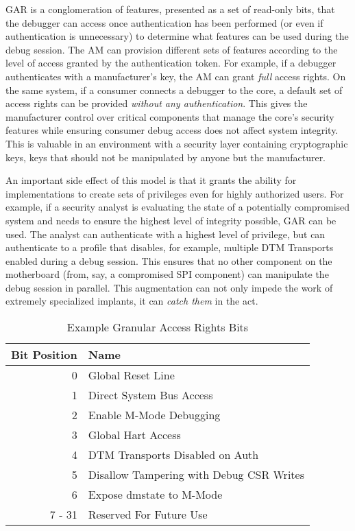 GAR is a conglomeration of features, presented as a set of read-only bits, that the debugger can access once authentication has been performed (or even if authentication is unnecessary) to determine what features can be used during the debug session. The AM can provision different sets of features according to the level of access granted by the authentication token. For example, if a debugger authenticates with a manufacturer's key, the AM can grant {\em full} access rights. On the same system, if a consumer connects a debugger to the core, a default set of access rights can be provided {\em without any authentication}. This gives the manufacturer control over critical components that manage the core's security features while ensuring consumer debug access does not affect system integrity. This is valuable in an environment with a security layer containing cryptographic keys, keys that should not be manipulated by anyone but the manufacturer. 

An important side effect of this model is that it grants the ability for implementations to create sets of privileges even for highly authorized users. For example, if a security analyst is evaluating the state of a potentially compromised system and needs to ensure the highest level of integrity possible, GAR can be used. The analyst can authenticate with a highest level of privilege, but can authenticate to a profile that disables, for example, multiple DTM Transports enabled during a debug session. This ensures that no other component on the motherboard (from, say, a compromised SPI component) can manipulate the debug session in parallel. This augmentation can not only impede the work of extremely specialized implants, it can {\em catch them} in the act. 

\begin{table}[htp]
    \begin{center}
        \caption{Example Granular Access Rights Bits}
        \label{tab:gartable}
        \begin{tabular}{|r|l|}
            \hline
            Bit Position & Name \\
            \hline
            0 & Global Reset Line \\
            1 & Direct System Bus Access \\
            2 & Enable M-Mode Debugging \\
            3 & Global Hart Access \\
            4 & DTM Transports Disabled on Auth \\
            5 & Disallow Tampering with Debug CSR Writes \\
            6 & Expose dmstate to M-Mode \\
            7 - 31 & Reserved For Future Use \\
            \hline
        \end{tabular}
    \end{center}
\end{table}

